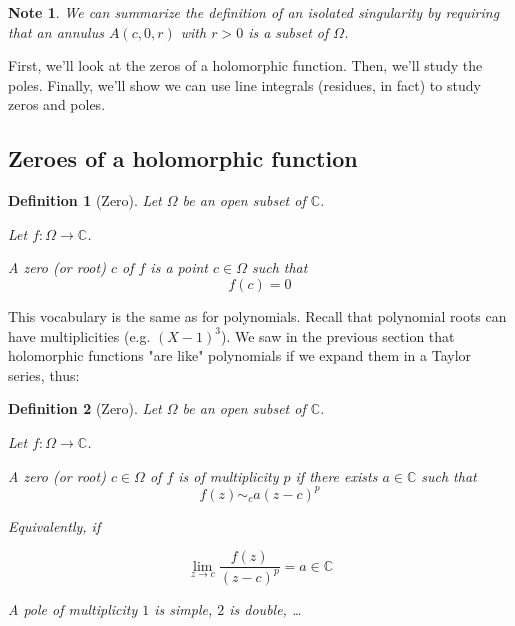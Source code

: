 \documentclass{article}
\newtheorem*{defi}{Definition}
\newtheorem*{note}{Note}
\begin{document}
\begin{note}
    We can summarize the definition of an isolated singularity by requiring that an annulus $A(c, 0, r)$ with $r>0$ is a subset of $\Omega$.
\end{note}


First, we'll look at the zeros of a holomorphic function. Then, we'll study the poles. Finally, we'll show we can use line integrals (residues, in fact) to study zeros and poles.


\subsection{Zeroes of a holomorphic function}

\begin{defi}
    [Zero]
    Let $\Omega$ be an open subset of $\mathbb{C}$.

    Let $f: \Omega \rightarrow \mathbb{C}$.

    A zero (or root) $c$ of $f$ is a point $c\in\Omega$ such that $$ f(c) = 0$$
\end{defi}

This vocabulary is the same as for polynomials. Recall that polynomial roots can have multiplicities (e.g. $(X-1)^3$). We saw in the previous section that holomorphic functions "are like" polynomials if we expand them in a Taylor series, thus:

\begin{defi}
    [Zero]
    Let $\Omega$ be an open subset of $\mathbb{C}$.

    Let $f: \Omega \rightarrow \mathbb{C}$.

    A zero (or root) $c\in\Omega$ of $f$ is of multiplicity $p$ if there exists $a\in\mathbb{C}$ such that
    $$ f(z) \sim_{c}a(z-c)^p $$
    
    Equivalently, if 

    $$\lim_{z\rightarrow c} \frac{f(z)}{(z-c)^p} =a \in\mathbb{C}$$

    A pole of multiplicity $ 1$ is simple, $2$ is double, \dots 
\end{defi}
\end{document}

